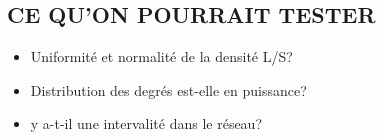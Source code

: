 \documentclass[
]{article}
\providecommand{\tightlist}{%
  \setlength{\itemsep}{0pt}\setlength{\parskip}{0pt}}
\begin{document}
\hypertarget{ce-quon-pourrait-tester}{%
\subsection{CE QU'ON POURRAIT TESTER}\label{ce-quon-pourrait-tester}}

\begin{itemize}
\tightlist
\item
  Uniformité et normalité de la densité L/S?
\item
  Distribution des degrés est-elle en puissance?
\item
  y a-t-il une intervalité dans le réseau?
\end{itemize}
\end{document}
